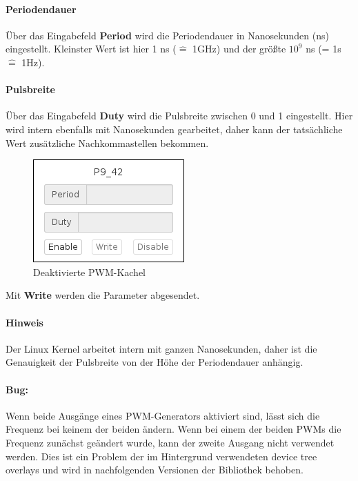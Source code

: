 \paragraph{Periodendauer} Über das Eingabefeld \textbf{Period} wird die Periodendauer in Nanosekunden (ns) eingestellt. Kleinster Wert ist hier 1 ns ($\hat{=}$ 1GHz) und der größte $10^9$ ns (= 1s $\hat{=}$ 1Hz).

\paragraph{Pulsbreite} Über das Eingabefeld \textbf{Duty} wird die Pulsbreite zwischen 0 und 1 eingestellt. Hier wird intern ebenfalls mit Nanosekunden gearbeitet, daher kann der tatsächliche Wert zusätzliche Nachkommastellen bekommen.

\begin{figure}[ht] 
	\centering
	\includegraphics[]{betriebsanleitung/images/mainWindowPWMDisabled.png}
	\caption{Deaktivierte PWM-Kachel}
	\label{fig:mainWindowPWMDisabled}
\end{figure}

Mit \textbf{Write} werden die Parameter abgesendet.

\paragraph{Hinweis} Der Linux Kernel arbeitet intern mit ganzen Nanosekunden, daher ist die Genauigkeit der Pulsbreite von der Höhe der Periodendauer anhängig.

\paragraph{Bug:} Wenn beide Ausgänge eines PWM-Generators aktiviert sind, lässt sich die Frequenz bei keinem der beiden ändern. Wenn bei einem der beiden PWMs die Frequenz zunächst geändert wurde, kann der zweite Ausgang nicht verwendet werden. Dies ist ein Problem der im Hintergrund verwendeten device tree overlays und wird in nachfolgenden Versionen der Bibliothek behoben.


